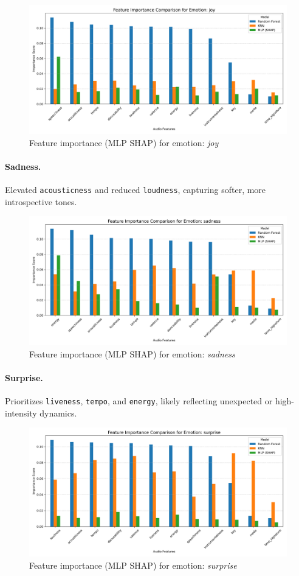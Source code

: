 \documentclass{article}
\begin{document}
\begin{figure}[H]
\centering
\includegraphics[width=0.8\linewidth]{Graphics/per_label/joy_feature_importance.png}
\caption{Feature importance (MLP SHAP) for emotion: \textit{joy}}
\label{fig:shap_joy}
\end{figure}

\paragraph{Sadness.} Elevated \texttt{acousticness} and reduced \texttt{loudness}, capturing softer, more introspective tones.

\begin{figure}[H]
\centering
\includegraphics[width=0.8\linewidth]{Graphics/per_label/sadness_feature_importance.png}
\caption{Feature importance (MLP SHAP) for emotion: \textit{sadness}}
\label{fig:shap_sadness}
\end{figure}

\paragraph{Surprise.} Prioritizes \texttt{liveness}, \texttt{tempo}, and \texttt{energy}, likely reflecting unexpected or high-intensity dynamics.

\begin{figure}[H]
\centering
\includegraphics[width=0.8\linewidth]{Graphics/per_label/surprise_feature_importance.png}
\caption{Feature importance (MLP SHAP) for emotion: \textit{surprise}}
\label{fig:shap_surprise}
\end{figure}
\end{document}
